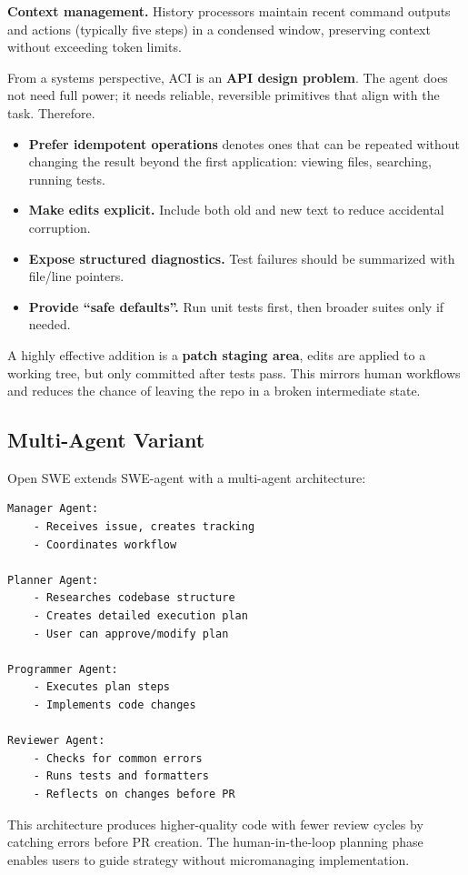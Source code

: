 \textbf{Context management.} History processors maintain recent command outputs and actions (typically five steps) in a condensed window, preserving context without exceeding token limits.

From a systems perspective, ACI is an \textbf{API design problem}. The agent does not need full power; it needs reliable, reversible primitives that align with the task. Therefore.
\begin{itemize}
\item \textbf{Prefer idempotent operations} denotes ones that can be repeated without changing the result beyond the first application: viewing files, searching, running tests.
\item \textbf{Make edits explicit.} Include both old and new text to reduce accidental corruption.
\item \textbf{Expose structured diagnostics.} Test failures should be summarized with file/line pointers.
\item \textbf{Provide ``safe defaults''.} Run unit tests first, then broader suites only if needed.
\end{itemize}

A highly effective addition is a \textbf{patch staging area}, edits are applied to a working tree, but only committed after tests pass. This mirrors human workflows and reduces the chance of leaving the repo in a broken intermediate state.

\subsection{Multi-Agent Variant}

Open SWE \cite{openswe2025} extends SWE-agent with a multi-agent architecture:

\begin{verbatim}
Manager Agent:
    - Receives issue, creates tracking
    - Coordinates workflow
    
Planner Agent:
    - Researches codebase structure
    - Creates detailed execution plan
    - User can approve/modify plan
    
Programmer Agent:
    - Executes plan steps
    - Implements code changes
    
Reviewer Agent:
    - Checks for common errors
    - Runs tests and formatters
    - Reflects on changes before PR
\end{verbatim}

This architecture produces higher-quality code with fewer review cycles by catching errors before PR creation. The human-in-the-loop planning phase enables users to guide strategy without micromanaging implementation.

